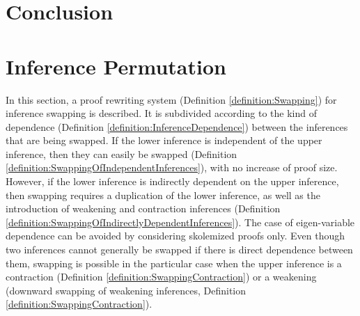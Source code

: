 \documentclass{llncs}
\begin{document}
\section{Conclusion}






%

\appendix

\section{Inference Permutation}
\label{appendix:InferencePermutation}

In this section, a proof rewriting system (Definition \ref{definition:Swapping}) for inference swapping
is described. It is subdivided according to the kind of dependence (Definition \ref{definition:InferenceDependence}) between the inferences that are being swapped. If the lower inference is independent of the upper inference, then they can easily be swapped (Definition \ref{definition:SwappingOfIndependentInferences}), with no increase of proof size. However, if the lower inference is indirectly dependent on the upper inference, then swapping requires a duplication of the lower inference, as well as the introduction of weakening and contraction inferences (Definition \ref{definition:SwappingOfIndirectlyDependentInferences}). The case of eigen-variable dependence can be avoided by considering skolemized proofs only. Even though two inferences cannot generally be swapped if there is direct dependence between them, swapping is possible in the particular case when the upper inference is a contraction (Definition \ref{definition:SwappingContraction}) or a weakening (downward swapping of weakening inferences, Definition \ref{definition:SwappingContraction}). 
\end{document}
